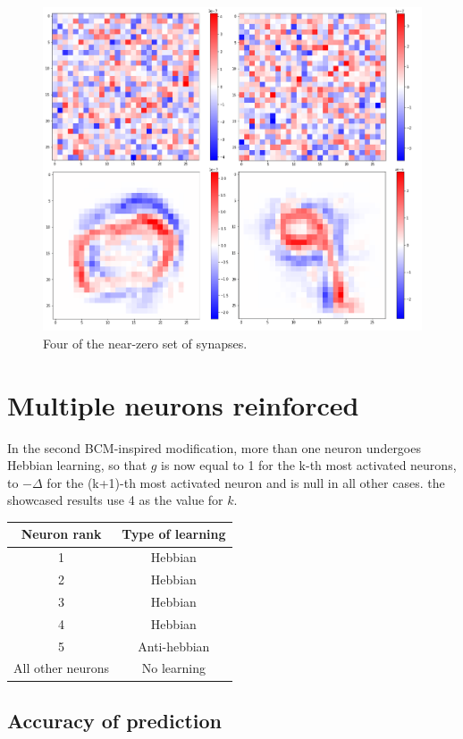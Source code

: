 \documentclass[a4paper]{report}
\begin{document}
\begin{figure} [H]
\centering
\includegraphics [width=12cm ] {h/centodue.png}
\caption{Four of the near-zero set of synapses.}
\label{nearzero}
\end{figure}

\section{Multiple neurons reinforced}

In the second BCM-inspired modification, more than one neuron undergoes Hebbian learning, so that $g$ is now equal to 1 for the k-th most activated neurons, to $-\Delta$ for the (k+1)-th most activated neuron and is null in all other cases.
the showcased results use 4 as the value for $k$.

\begin{center}
	\begin{tabular} {c|c}
		\textbf{Neuron rank} & \textbf{Type of learning} \\
		\hline
		1 & Hebbian \\
		2 & Hebbian \\
		3 & Hebbian \\
		4 & Hebbian \\
		5 & Anti-hebbian \\
		All other neurons & No learning \\
	\end{tabular}
\end{center}


\subsection{Accuracy of prediction}
\end{document}

